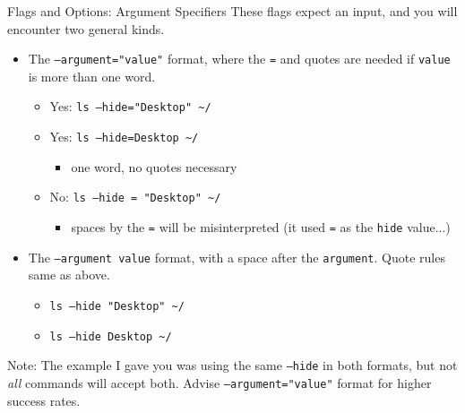 \documentclass[11pt]{beamer}
\begin{document}
\begin{frame}[fragile]{Flags and Options: Argument Specifiers}
  These flags expect an input, and you will encounter two general kinds.
  \begin{itemize}
    \item The \texttt{--argument="value"} format, where the \texttt{=} and quotes are needed if \texttt{value} is
          more than one word.
    \begin{itemize}
      \item Yes: \texttt{ls --hide="Desktop" \textasciitilde/}
      \item Yes: \texttt{ls --hide=Desktop \textasciitilde/}
      \begin{itemize}
        \item one word, no quotes necessary
      \end{itemize}
      \item No: \texttt{ls --hide = "Desktop" \textasciitilde/}
      \begin{itemize}
        \item spaces by the \texttt{=} will be misinterpreted (it used \texttt{=} as the \texttt{hide} value...)
      \end{itemize}
    \end{itemize}
    \item The \texttt{--argument value} format, with a space after the \texttt{argument}. Quote rules same as above.
    \begin{itemize}
      \item \texttt{ls --hide "Desktop" \textasciitilde/}
      \item \texttt{ls --hide Desktop \textasciitilde/}
    \end{itemize}
  \end{itemize}
  {\tiny Note: The example I gave you was using the same \texttt{--hide} in both formats, but not \emph{all} commands will
    accept both.  Advise \texttt{--argument="value"} format for higher success rates.}
\end{frame}
\end{document}
